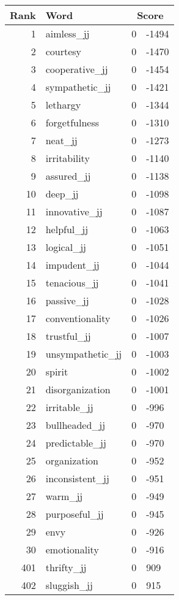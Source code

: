 \begin{longtable}[!htbp]{| rlr@{.}l |}
    \hline
    \textbf{Rank} & \textbf{Word} & \multicolumn{2}{c|}{\textbf{Score}} \\
    \hline
    \endhead
    1 & aimless\_jj & 0 & -1494 \\
    2 & courtesy & 0 & -1470 \\
    3 & cooperative\_jj & 0 & -1454 \\
    4 & sympathetic\_jj & 0 & -1421 \\
    5 & lethargy & 0 & -1344 \\
    6 & forgetfulness & 0 & -1310 \\
    7 & neat\_jj & 0 & -1273 \\
    8 & irritability & 0 & -1140 \\
    9 & assured\_jj & 0 & -1138 \\
    10 & deep\_jj & 0 & -1098 \\
    11 & innovative\_jj & 0 & -1087 \\
    12 & helpful\_jj & 0 & -1063 \\
    13 & logical\_jj & 0 & -1051 \\
    14 & impudent\_jj & 0 & -1044 \\
    15 & tenacious\_jj & 0 & -1041 \\
    16 & passive\_jj & 0 & -1028 \\
    17 & conventionality & 0 & -1026 \\
    18 & trustful\_jj & 0 & -1007 \\
    19 & unsympathetic\_jj & 0 & -1003 \\
    20 & spirit & 0 & -1002 \\
    21 & disorganization & 0 & -1001 \\
    22 & irritable\_jj & 0 & -996 \\
    23 & bullheaded\_jj & 0 & -970 \\
    24 & predictable\_jj & 0 & -970 \\
    25 & organization & 0 & -952 \\
    26 & inconsistent\_jj & 0 & -951 \\
    27 & warm\_jj & 0 & -949 \\
    28 & purposeful\_jj & 0 & -945 \\
    29 & envy & 0 & -926 \\
    30 & emotionality & 0 & -916 \\
    401 & thrifty\_jj & 0 & 909 \\
    402 & sluggish\_jj & 0 & 915 \\

\end{longtable}
